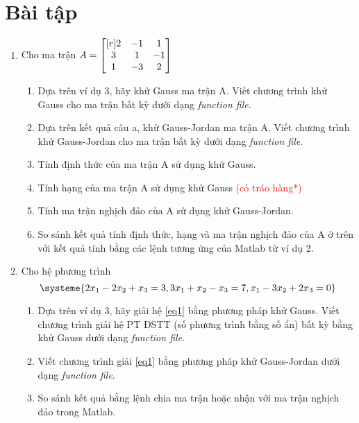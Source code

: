 \section*{Bài tập}
\begin{enumerate}
	
	\item Cho ma trận
	$A = \begin{bmatrix}[r]2 & -1 & 1 \\ 3 & 1 & -1 \\ 1 & -3 & 2\end{bmatrix}$
	\begin{enumerate}
		\item Dựa trên ví dụ 3, hãy khử Gauss ma trận A. Viết chương trình khử Gauss cho ma trận bất
		kỳ dưới dạng \textit{function file}.
		\item Dựa trên kết quả câu a, khử Gauss-Jordan ma trận A. Viết chương trình khử Gauss-Jordan
		cho ma trận bất kỳ dưới dạng \textit{function file}.
		\item Tính định thức của ma trận A sử dụng khử Gauss.
		\item Tính hạng của ma trận A sử dụng khử Gauss \textcolor{red}{(có tráo hàng*)}
		\item Tính ma trận nghịch đảo của A sử dụng khử Gauss-Jordan.
		\item So sánh kết quả tính định thức, hạng và ma trận nghịch đảo của A ở trên với kết quả tính
		bằng các lệnh tương ứng của Matlab từ ví dụ 2.
	\end{enumerate}

	\item Cho hệ phương trình
		\begin{equation}
			\label{eq1}
			\systeme{2x_1-2x_2+x_3=3, 3x_1+x_2-x_3=7, x_1-3x_2+2x_3=0}
		\end{equation}
	\begin{enumerate}
		\item Dựa trên ví dụ 3, hãy giải hệ \eqref{eq1} bằng phương pháp khử Gauss. Viết chương trình giải hệ PT ĐSTT (số phương trình bằng số ẩn) bất kỳ bằng khử Gauss dưới dạng \textit{function file}.
		\item Viết chương trình giải \eqref{eq1} bằng phương pháp khử Gauss-Jordan dưới dạng \textit{function file}.
		\item So sánh kết quả bằng lệnh chia ma trận hoặc nhận với ma trận nghịch đảo trong Matlab.
	\end{enumerate}


\end{enumerate}
